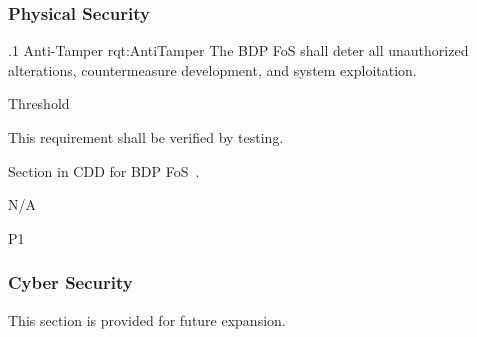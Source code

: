 \subsubsection{Physical Security}
\label{sssec_Physical_Security}


\ONERQMTV
{\RqtNumberBase.1}
{Anti-Tamper}
{rqt:AntiTamper}
{The BDP FoS shall deter all unauthorized alterations, countermeasure development, and system exploitation.}
{
	\item [Phase 1] Threshold
}
{This requirement shall be verified by testing.}
{
\item [6.2] Section in CDD for BDP FoS~\cite{ref__BDP_FOS_CDD}.
}
{
	\item N/A
}
{P1}

\subsubsection{Cyber Security}
\label{sssec_Cyber_Security}

This section is provided for future expansion.